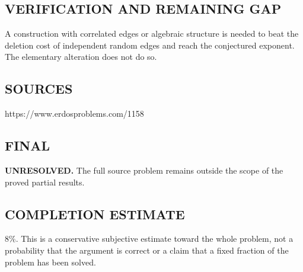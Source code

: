 \subsection*{VERIFICATION AND REMAINING GAP}
A construction with correlated edges or algebraic structure is needed to
beat the deletion cost of independent random edges and reach the conjectured
exponent. The elementary alteration does not do so.

\subsection*{SOURCES}
https://www.erdosproblems.com/1158

\subsection*{FINAL}
\textbf{UNRESOLVED.} The full source problem remains outside the scope of the proved partial results.

\subsection*{COMPLETION ESTIMATE}
$8\%$. This is a conservative subjective estimate toward the whole problem, not a probability that the argument is correct or a claim that a fixed fraction of the problem has been solved.

